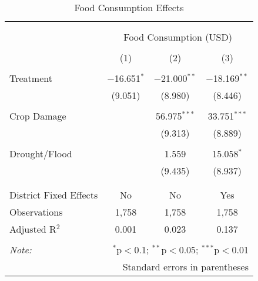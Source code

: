 
\begin{table}[!htbp] \centering 
  \caption{Food Consumption Effects} 
  \label{} 
\begin{tabular}{@{\extracolsep{5pt}}lccc} 
\\[-1.8ex]\hline 
\hline \\[-1.8ex] 
\\[-1.8ex] & \multicolumn{3}{c}{Food Consumption (USD)} \\ 
\\[-1.8ex] & (1) & (2) & (3)\\ 
\hline \\[-1.8ex] 
 Treatment & $-$16.651$^{*}$ & $-$21.000$^{**}$ & $-$18.169$^{**}$ \\ 
  & (9.051) & (8.980) & (8.446) \\ 
  & & & \\ 
 Crop Damage &  & 56.975$^{***}$ & 33.751$^{***}$ \\ 
  &  & (9.313) & (8.889) \\ 
  & & & \\ 
 Drought/Flood &  & 1.559 & 15.058$^{*}$ \\ 
  &  & (9.435) & (8.937) \\ 
  & & & \\ 
\hline \\[-1.8ex] 
District Fixed Effects & No & No & Yes \\ 
Observations & 1,758 & 1,758 & 1,758 \\ 
Adjusted R$^{2}$ & 0.001 & 0.023 & 0.137 \\ 
\hline 
\hline \\[-1.8ex] 
\textit{Note:}  & \multicolumn{3}{r}{$^{*}$p$<$0.1; $^{**}$p$<$0.05; $^{***}$p$<$0.01} \\ 
 & \multicolumn{3}{r}{Standard errors in parentheses} \\ 
\end{tabular} 
\end{table} 
